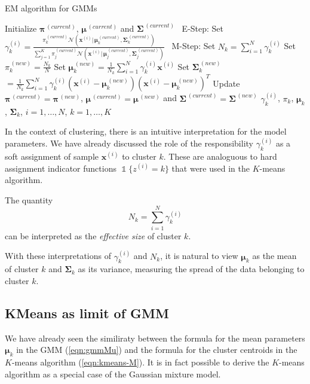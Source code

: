 \documentclass[final,3p,times,twocolumn]{elsarticle}
\let\bs\boldsymbol
\DeclareMathOperator*{\id}{\mathds{1}}
\begin{document}
\begin{algorithm}
\caption{EM algorithm for GMMs}
\label{alg:gmm}
\begin{algorithmic}[1]
\State Initialize $\bs\pi^{\,(current)}$, $\bs\mu^{\,(current)}$ and $\bs\Sigma^{\,(current)}$
\Statex\Repeat
\Statex \quad\, E-Step:
\State Set $\gamma_k^{(i)} = \frac{\pi_k^{\,(current)}\mathcal{N}(\bs x^{(i)}|\,\bs\mu_k^{\,(current)}, \bs\Sigma_k^{\,(current)})}{\sum_{j=1}^K \pi_j^{\,(current)}\mathcal{N}(\bs x^{(i)}|\,\bs\mu_j^{\,(current)}, \bs\Sigma_j^{\,(current)})}$
\EndFor
\EndFor
\Statex\Statex \quad\, M-Step:
\State Set $N_k = \sum_{i=1}^N \gamma_k^{(i)}$
\State Set $\pi_k^{\,(new)} = \frac{N_k}{N}$
\State Set $\bs\mu_k^{\,(new)} = \frac{1}{N_k}\sum_{i=1}^N \gamma_k^{(i)} \bs x^{(i)}$
\State Set $\bs\Sigma_k^{\,(new)} $
\Statex \qquad \qquad $=\frac{1}{N_k}\sum_{i=1}^N \gamma_k^{(i)}(\bs x^{(i)} - \bs\mu_k^{\,(new)})(\bs x^{(i)} - \bs\mu_k^{\,(new)})^T$
\Statex\State Update $\bs\pi^{\,(current)} = \bs\pi^{\,(new)}$, $\bs\mu^{\,(current)} = \bs\mu^{\,(new)}$
\Statex \qquad\qquad and $\bs\Sigma^{\,(current)} = \bs\Sigma^{\,(new)}$
\EndFor
{}
\Statex\State\Return $\gamma^{(i)}_k$, $\pi_k$, $\bs\mu_k$, $\bs\Sigma_k$, \quad $i=1,\dots,N$, $k=1,\dots,K$
\end{algorithmic}
\end{algorithm}

In the context of clustering, there is an intuitive interpretation for the model parameters.
We have already discussed the role of the responsibility $\gamma_k^{(i)}$ as a soft assignment of sample $\bs x^{(i)}$ to cluster $k$.
These are analoguous to hard assignment indicator functions $\id\{z^{(i)}=k\}$ that were used in the $K$-means algorithm.

The quantity
\begin{equation}
\label{eqn:gmmclustersize}
N_k = \sum_{i=1}^N \gamma_k^{(i)}
\end{equation}
can be interpreted as the \emph{effective size} of cluster $k$.

With these interpretations of $\gamma_k^{(i)}$ and $N_k$, it is natural to view $\bs\mu_k$ as the mean of cluster $k$ and $\bs\Sigma_k$ as its variance, measuring the spread of the data belonging to cluster $k$.



\subsection{KMeans as limit of GMM}
We have already seen the similiraty between the formula for the mean parameters $\bs\mu_k$ in the GMM (\ref{eqn:gmmMu}) and the formula for the cluster centroids in the $K$-means algorithm (\ref{eqn:kmeans-M}).
It is in fact possible to derive the $K$-means algorithm as a special case of the Gaussian mixture model.
\end{document}
